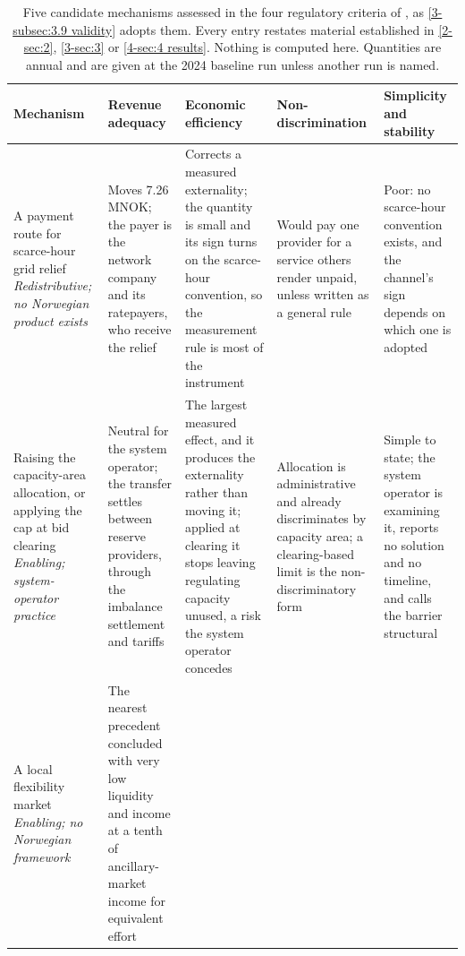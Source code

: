 \begin{table}[htbp]
\centering
\caption{Five candidate mechanisms assessed in the four regulatory criteria of \cite{bergaentzle_electricity_2019}, as \autoref{3-subsec:3.9 validity} adopts them. Every entry restates material established in \autoref{2-sec:2}, \autoref{3-sec:3} or \autoref{4-sec:4 results}. Nothing is computed here. Quantities are annual and are given at the 2024 baseline run unless another run is named.}
\footnotesize
\begin{tabular}{>{\raggedright}p{3.4cm}
                >{\raggedright}p{3.0cm}
                >{\raggedright}p{3.4cm}
                >{\raggedright}p{2.7cm}
                >{\raggedright\arraybackslash}p{3.0cm}}
\toprule
\textbf{Mechanism} &
\textbf{Revenue adequacy} &
\textbf{Economic efficiency} &
\textbf{Non-discrimination} &
\textbf{Simplicity and stability} \\
\midrule
A payment route for scarce-hour grid relief \newline \emph{Redistributive; no Norwegian product exists} &
Moves 7.26 MNOK; the payer is the network company and its ratepayers, who receive the relief &
Corrects a measured externality; the quantity is small and its sign turns on the scarce-hour convention, so the measurement rule is most of the instrument &
Would pay one provider for a service others render unpaid, unless written as a general rule &
Poor: no scarce-hour convention exists, and the channel's sign depends on which one is adopted \\[4pt]
Raising the capacity-area allocation, or applying the cap at bid clearing \newline \emph{Enabling; system-operator practice} &
Neutral for the system operator; the transfer settles between reserve providers, through the imbalance settlement and tariffs &
The largest measured effect, and it produces the externality rather than moving it; applied at clearing it stops leaving regulating capacity unused, a risk the system operator concedes &
Allocation is administrative and already discriminates by capacity area; a clearing-based limit is the non-discriminatory form &
Simple to state; the system operator is examining it, reports no solution and no timeline, and calls the barrier structural \\[4pt]
A local flexibility market \newline \emph{Enabling; no Norwegian framework} &
The nearest precedent concluded with very low liquidity and income at a tenth of ancillary-market income for equivalent effort &

\end{tabular}
\end{table}
